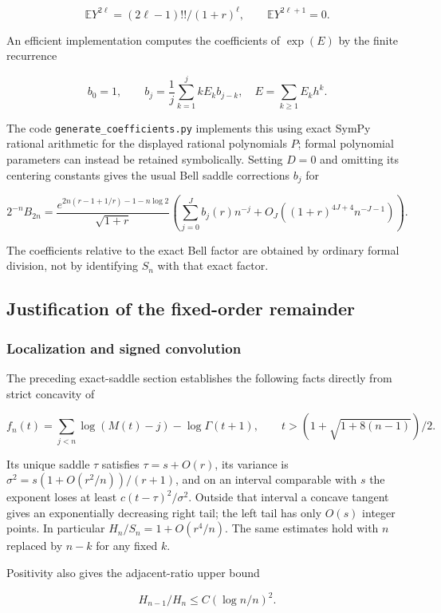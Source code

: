 \[
 \mathbb E Y^{2\ell}=(2\ell-1)!!/(1+r)^\ell,
 \qquad \mathbb E Y^{2\ell+1}=0.
\]

An efficient implementation computes the coefficients of \(\exp(E)\) by
the finite recurrence

\[
 b_0=1,\qquad b_j=\frac1j\sum_{k=1}^j kE_kb_{j-k},
 \quad E=\sum_{k\ge1}E_kh^k.
\]

The code \texttt{generate\_coefficients.py} implements this using exact
SymPy rational arithmetic for the displayed rational polynomials \(P\);
formal polynomial parameters can instead be retained symbolically.
Setting \(D=0\) and omitting its centering constants gives the usual
Bell saddle corrections \(b_j\) for

\[
 2^{-n}B_{2n}=\frac{e^{2n(r-1+1/r)-1-n\log2}}{\sqrt{1+r}}
 \left(\sum_{j=0}^J b_j(r)n^{-j}
 +O_J((1+r)^{4J+4}n^{-J-1})\right).
\]

The coefficients relative to the exact Bell factor are obtained by
ordinary formal division, not by identifying \(S_n\) with that exact
factor.

\subsection{Justification of the fixed-order
remainder}\label{tcl:justification-of-the-fixed-order-remainder}

\subsubsection{Localization and signed
convolution}\label{tcl:localization-and-signed-convolution}

The preceding exact-saddle section establishes the following facts
directly from strict concavity of

\[
 f_n(t)=\sum_{j<n}\log(M(t)-j)-\log\Gamma(t+1),
 \qquad t>(1+\sqrt{1+8(n-1)})/2.
\]

Its unique saddle \(\tau\) satisfies \(\tau=s+O(r)\), its variance is
\(\sigma^2=s(1+O(r^2/n))/(r+1)\), and on an interval comparable with
\(s\) the exponent loses at least \(c(t-\tau)^2/\sigma^2\). Outside that
interval a concave tangent gives an exponentially decreasing right tail;
the left tail has only \(O(s)\) integer points. In particular
\(H_n/S_n=1+O(r^4/n)\). The same estimates hold with \(n\) replaced by
\(n-k\) for any fixed \(k\).

Positivity also gives the adjacent-ratio upper bound

\[
 H_{n-1}/H_n\le C(\log n/n)^2.
\]

